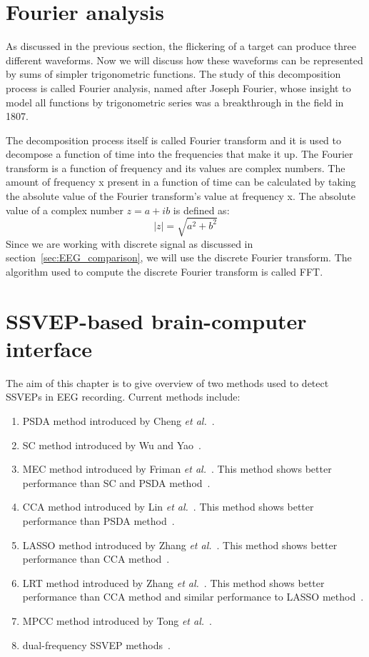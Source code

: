 \section{Fourier analysis}

As discussed in the previous section, the flickering of a target can produce three different waveforms. Now we will discuss how these waveforms can be represented by sums of simpler trigonometric functions. The study of this decomposition process is called Fourier analysis, named after Joseph Fourier, whose insight to model all functions by trigonometric series was a breakthrough in the field in 1807.

The decomposition process itself is called Fourier transform and it is used to decompose a function of time into the frequencies that make it up. The Fourier transform is a function of frequency and its values are complex numbers. The amount of frequency x present in a function of time can be calculated by taking the absolute value of the Fourier transform's value at frequency x. The absolute value of a complex number $z=a+ib$ is defined as:
\begin{equation}
	|z|=\sqrt{a^2+b^2}
\end{equation}
Since we are working with discrete signal as discussed in section~\ref{sec:EEG_comparison}, we will use the discrete Fourier transform. The algorithm used to compute the discrete Fourier transform is called \gls{FFT}.

\section{SSVEP-based brain-computer interface}
\label{sec:SSVEP_detection}
The aim of this chapter is to give overview of two methods used to detect \glspl{SSVEP} in \gls{EEG} recording. Current methods include:
\begin{enumerate}
	\item \gls{PSDA} method introduced by Cheng \emph{et al.}~\cite{psda}.
	\item \gls{SC} method introduced by Wu and Yao~\cite{sc}.
	\item \gls{MEC} method introduced by Friman \emph{et al.}~\cite{mec}. This method shows better performance than \gls{SC} and \gls{PSDA} method~\cite{mec_comparison}.
	\item \gls{CCA} method introduced by Lin \emph{et al.}~\cite{cca_lin}. This method shows better performance than \gls{PSDA} method~\cite{bin2009cca}.
	\item \gls{LASSO} method introduced by Zhang \emph{et al.}~\cite{LASSO}. This method shows better performance than \gls{CCA} method~\cite{LASSO}.
	\item \gls{LRT} method introduced by Zhang \emph{et al.}~\cite{LRT}. This method shows better performance than \gls{CCA} method and similar performance to \gls{LASSO} method~\cite{LRT}.
	\item \gls{MPCC} method introduced by Tong \emph{et al.}~\cite{MPCC}.
	\item dual-frequency \gls{SSVEP} methods~\cite{dual1, dual2}.
\end{enumerate}


